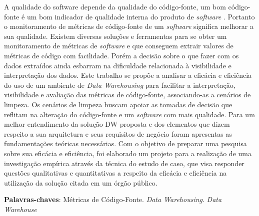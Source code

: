 \begin{resumo}

A qualidade do software depende da qualidade do código-fonte, um bom código-fonte é um bom indicador de qualidade interna do produto de \textit{software} \cite{ISO25023}. Portanto o monitoramento de métricas de código-fonte de um \textit{software} significa melhorar a sua qualidade. Existem diversas soluções e ferramentas para se obter um monitoramento de métricas de \textit{software} e que conseguem extrair valores de métricas de código com facilidade. Porém a decisão sobre o que fazer com os dados extraídos ainda esbarram na dificuldade relacionada à visibilidade e interpretação dos dados. Este trabalho se propõe a analisar a eficácia e eficiência do uso de um ambiente de \textit{Data Warehousing} para facilitar a interpretação, visibilidade e avaliação das métricas de código-fonte, associando-as a cenários de limpeza. Os cenários de limpeza buscam apoiar as tomadas de decisão que reflitam na alteração do código-fonte e um \textit{software} com mais qualidade. Para um melhor entendimento da solução DW proposta e dos elementos que dizem respeito a sua arquitetura e seus requisitos de negócio foram apresentas as fundamentações teóricas necessárias. Com o objetivo de preparar uma pesquisa sobre sua eficácia e eficiência, foi elaborado um projeto para a realização de uma investigação empírica através da técnica do estudo de caso, que visa responder questões qualitativas e quantitativas a respeito da eficácia e eficiência na utilização da solução citada em um órgão público.

 \vspace{\onelineskip}
    
 \noindent
 \textbf{Palavras-chaves}: Métricas de Código-Fonte. \textit{Data Warehousing}. \textit{Data Warehouse}
\end{resumo}
